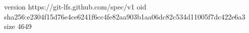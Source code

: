 version https://git-lfs.github.com/spec/v1
oid sha256:e2304f15d76e4ce6241f6cc4fe82aa903b1aa06dc82c534d11005f7dc422e6a3
size 4649
